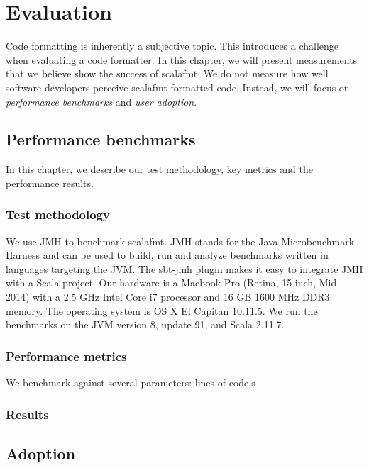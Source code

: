 \section{Evaluation}
Code formatting is inherently a subjective topic.
This introduces a challenge when evaluating a code formatter.
In this chapter, we will present measurements that we believe show the success of scalafmt.
We do not measure how well software developers perceive scalafmt formatted code.
Instead, we will focus on \emph{performance benchmarks} and \emph{user adoption}.

\subsection{Performance benchmarks}
In this chapter, we describe our test methodology, key metrics and the performance results.

\subsubsection{Test methodology}
We use JMH\autocite{OpenJ38:online} to benchmark scalafmt.
JMH stands for the Java Microbenchmark Harness and can be used to build, run and analyze benchmarks written in languages targeting the JVM.
The sbt-jmh\autocite{ktoso84:online} plugin makes it easy to integrate JMH with a Scala project.
Our hardware is a Macbook Pro (Retina, 15-inch, Mid 2014) with a 2.5 GHz Intel Core i7 processor and 16 GB 1600 MHz DDR3 memory.
The operating system is OS X El Capitan 10.11.5.
We run the benchmarks on the JVM version 8, update 91, and Scala 2.11.7.

\subsubsection{Performance metrics}
We benchmark against several parameters: lines of code,s
\subsubsection{Results}

\subsection{Adoption}\label{sec:adoption}

